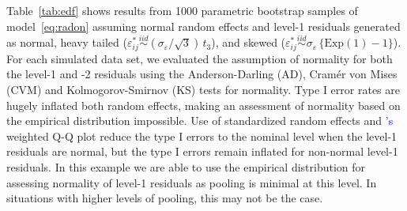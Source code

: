 \documentclass[12pt]{article} %
\newcommand{\citetapos}[1]{\citeauthor{#1}{\textcolor{blue}{'s}} }
\begin{document}
Table~\ref{tab:edf} shows results from 1000 parametric bootstrap samples of model~\eqref{eq:radon} assuming normal random effects and level-1 residuals generated as normal, heavy tailed ($\varepsilon_{ij}^* \overset{iid}{\sim} (\sigma_{\varepsilon} / \sqrt{3})\, t_3$), and skewed ($\varepsilon_{ij}^* \overset{iid}{\sim} \sigma_{\varepsilon} \, \{ \text{Exp}(1) - 1 \}$).
For each simulated data set, we evaluated the assumption of normality for both the level-1 and -2 residuals using the Anderson-Darling (AD), Cram{\'e}r von Mises (CVM) and  Kolmogorov-Smirnov (KS) tests for normality.  
Type I error rates are hugely inflated both random effects, making an assessment of normality based on the empirical distribution impossible. Use of standardized random effects and \citetapos{Lange:1989uu} weighted Q-Q plot reduce the type I errors to the nominal level when the level-1 residuals are normal, but the type I errors remain inflated for non-normal level-1 residuals.
In this example we are able to use the empirical distribution for assessing normality of  level-1 residuals  as  pooling is minimal at this level. In situations with higher levels of pooling, this may not be the case.
\end{document}
